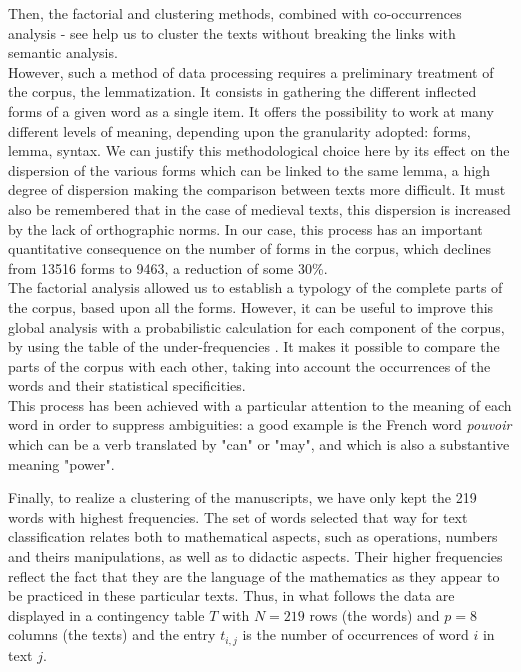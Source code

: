 \documentclass[preprint]{elsarticle}
\begin{document}
Then, the factorial and clustering methods, combined with co-occurrences analysis - see \cite{martinezcontribution2003} help us to cluster the texts without breaking the links with semantic analysis.\\

However, such a method of data processing requires a preliminary treatment of the corpus, the lemmatization. It consists in gathering the different inflected forms of a given word as a single item. It offers the possibility to work at many different levels of meaning, depending upon the granularity adopted: forms, lemma, syntax. We can justify this methodological choice here by its effect on the dispersion of the various forms which can be linked to the same lemma, a high degree of dispersion making the comparison between texts more difficult. It must also be remembered that in the case of medieval texts, this dispersion is increased by the lack of orthographic norms. In our case, this process has an important quantitative consequence on the number of forms in the corpus, which declines from 13516 forms to 9463, a reduction of some 30\%.\\

The factorial analysis allowed us to establish a typology of the complete parts of the corpus, based upon all the forms. However, it can be useful to improve this global analysis with a probabilistic calculation for each component of the corpus, by using the table of the under-frequencies \cite{lebartstatistique1994}. It makes it possible to compare the parts of the corpus with each other, taking into account the occurrences of the words and their statistical specificities.\\

This process has been achieved with a particular attention to the meaning of each word in order to suppress ambiguities: a good example is the French word \textit{pouvoir} which can be a verb translated by "can" or "may", and which is also a substantive meaning "power".

Finally, to realize a clustering of the manuscripts, we have only kept the 219 words with highest frequencies. The set of words selected that way for text classification relates both to mathematical aspects, such as operations, numbers and theirs manipulations, as well as to didactic aspects. Their higher frequencies reflect the fact that they are the language of the mathematics as they appear to be practiced in these particular texts. Thus, in what follows the data are displayed in a contingency table $T$ with $N=219$ rows (the words) and $p=8$ columns (the texts) and the entry $t_{i,j}$ is the number of occurrences of word $i$ in text $j$.
\end{document}
